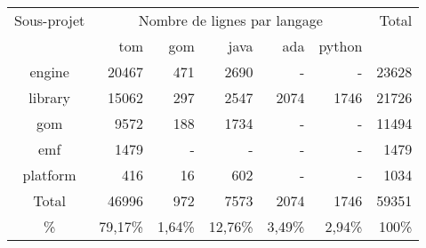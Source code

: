 \begin{tabular}{c|rrrrr|r}
  Sous-projet & \multicolumn{5}{c|}{Nombre de lignes par langage} & Total \\
  & tom & gom & java & ada & python & \\
  \hline
  engine & \num{20467} & \num{471} & \num{2690} & - & - & \num{23628} \\
  library & \num{15062} & \num{297} & \num{2547} & \num{2074} & \num{1746} & \num{21726} \\
  gom & \num{9572} & \num{188} & \num{1734} & - & - & \num{11494} \\
  emf & \num{1479} & - & - & - & - & \num{1479} \\
  platform & \num{416} & \num{16} & \num{602} & - & - & \num{1034} \\
  \hline
  Total & \num{46996} & \num{972} & \num{7573} & \num{2074} & \num{1746} & \num{59351} \\
  \% & 79,17\% & 1,64\% & 12,76\% & 3,49\% & 2,94\% & 100\% \\
\end{tabular}

